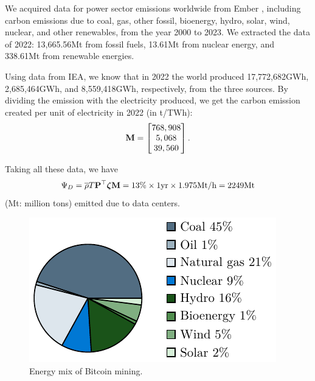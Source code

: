 \documentclass[12pt]{article}
\begin{document}
We acquired data for power sector emissions worldwide from Ember \citep{emission_dataset}, including carbon emissions due to coal, gas, other fossil, bioenergy, hydro, solar, wind, nuclear, and other renewables, from the year 2000 to 2023. We extracted the data of 2022: 13,665.56Mt from fossil fuels, 13.61Mt from nuclear energy, and 338.61Mt from renewable energies.

Using data from IEA, we know that in 2022 the world produced 17,772,682GWh, 2,685,464GWh, and 8,559,418GWh, respectively, from the three sources. By dividing the emission with the electricity produced, we get the carbon emission created per unit of electricity in 2022 (in t/TWh):
\begin{equation}
	\vb{M} = \begin{bmatrix}
		768,908 \\ 5,068 \\ 39,560
	\end{bmatrix}.
\end{equation}

Taking all these data, we have
\begin{equation}
	\Psi_D
	= \overline{\rho} T \vb{P}^\top \boldsymbol{\zeta} \vb{M}
	= 13\% \times 1 {\rm yr} \times 1.975 {\rm Mt/h} = 2249 {\rm Mt}
\end{equation}
 (Mt: million tons) emitted due to data centers.

\begin{figure}[!t]
	\centering
	\includegraphics{figures/data/bitcoin_mix.pdf}
	\caption{Energy mix of Bitcoin mining.}
	\label{fig_bitcoin_mix}
\end{figure}
\end{document}
